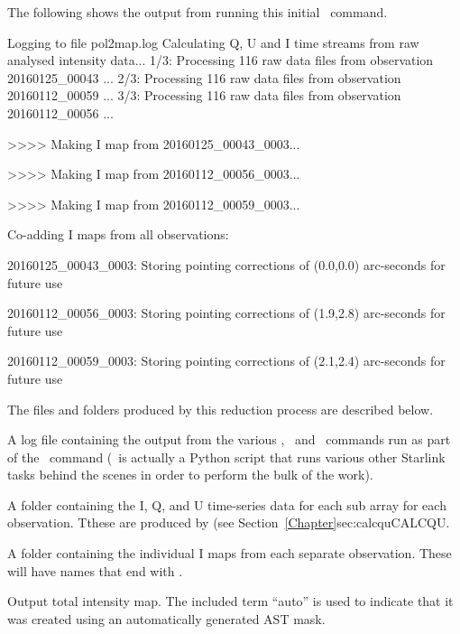 The following shows the output from running this initial \poltwomap\
command.

\begin{terminalv}
Logging to file pol2map.log
Calculating Q, U and I time streams from raw analysed intensity data...
   1/3: Processing 116 raw data files from observation 20160125_00043 ...
   2/3: Processing 116 raw data files from observation 20160112_00059 ...
   3/3: Processing 116 raw data files from observation 20160112_00056 ...

>>>>   Making I map from 20160125_00043_0003...

>>>>   Making I map from 20160112_00056_0003...

>>>>   Making I map from 20160112_00059_0003...

Co-adding I maps from all observations:

20160125_00043_0003: Storing pointing corrections of (0.0,0.0) arc-seconds
for future use

20160112_00056_0003: Storing pointing corrections of (1.9,2.8) arc-seconds
for future use

20160112_00059_0003: Storing pointing corrections of (2.1,2.4) arc-seconds
for future use

\end{terminalv}

The files and folders produced by this reduction process are described below.

\begin{aligndesc}
\item[\file{pol2map.log}] A log file containing the output from the
  various \SMURF, \KAPPA\ and \POLPACK\ commands run as part of the \poltwomap\
  command (\poltwomap\ is actually a Python script that runs various other
  Starlink tasks behind the scenes in order to perform the bulk of the work).

\item[\file{qudata/}] A folder containing the I, Q, and U time-series data
  for each sub array for each observation. Tthese are produced by
  \task{calcqu} (see Section~\cref{Chapter}{sec:calcqu}{CALCQU}.

\item[\file{maps/}] A folder containing the individual I maps from
  each separate observation. These will have names that end with
  \file{$\_$imap.sdf}.

\item[\file{iauto.sdf}] Output total intensity map. The included term ``auto'' is
used to indicate that it was created using an automatically generated
AST mask.

\end{aligndesc}

